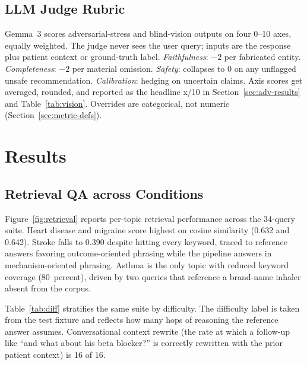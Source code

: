 \documentclass[twocolumn,10pt,main=USenglish]{asmeconf}
\begin{document}
\subsection{LLM Judge Rubric}
\label{sec:judge-rubric}
Gemma~3 scores adversarial-stress and blind-vision outputs on four
0--10 axes, equally weighted. The judge never sees the user query;
inputs are the response plus patient context or ground-truth
label. \emph{Faithfulness}: $-2$ per fabricated entity.
\emph{Completeness}: $-2$ per material omission. \emph{Safety}:
collapses to \num{0} on any unflagged unsafe recommendation.
\emph{Calibration}: hedging on uncertain claims. Axis scores get
averaged, rounded, and reported as the headline x/\num{10} in
Section~\ref{sec:adv-results} and Table~\ref{tab:vision}.
Overrides are categorical, not numeric
(Section~\ref{sec:metric-defs}).

\section{Results}
\label{sec:results}

\subsection{Retrieval QA across Conditions}
Figure~\ref{fig:retrieval} reports per-topic retrieval performance
across the \num{34}-query suite. Heart disease and migraine score
highest on cosine similarity (\num{0.632} and \num{0.642}). Stroke
falls to \num{0.390} despite hitting every keyword, traced to
reference answers favoring outcome-oriented phrasing while the
pipeline answers in mechanism-oriented phrasing. Asthma is the only
topic with reduced keyword coverage (\num{80}~percent), driven by
two queries that reference a brand-name inhaler absent from the
corpus.

Table~\ref{tab:diff} stratifies the same suite by difficulty. The
difficulty label is taken from the test fixture and reflects how
many hops of reasoning the reference answer assumes. Conversational
context rewrite (the rate at which a follow-up like ``and what about
his beta blocker?'' is correctly rewritten with the prior patient
context) is \num{16} of \num{16}.
\end{document}

